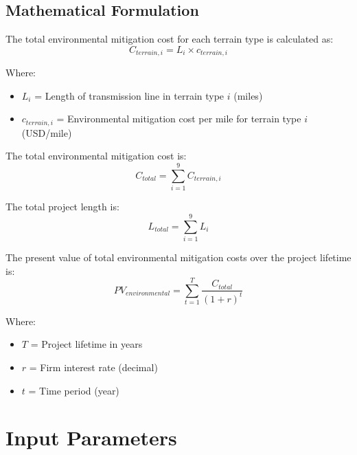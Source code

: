 \documentclass[12pt]{article}
\begin{document}
\subsection{Mathematical Formulation}

The total environmental mitigation cost for each terrain type is calculated as:
\begin{equation}
C_{terrain,i} = L_i \times c_{terrain,i}
\end{equation}

Where:
\begin{itemize}
    \item $L_i$ = Length of transmission line in terrain type $i$ (miles)
    \item $c_{terrain,i}$ = Environmental mitigation cost per mile for terrain type $i$ (USD/mile)
\end{itemize}

The total environmental mitigation cost is:
\begin{equation}
C_{total} = \sum_{i=1}^{9} C_{terrain,i}
\end{equation}

The total project length is:
\begin{equation}
L_{total} = \sum_{i=1}^{9} L_i
\end{equation}

The present value of total environmental mitigation costs over the project lifetime is:
\begin{equation}
PV_{environmental} = \sum_{t=1}^{T} \frac{C_{total}}{(1 + r)^t}
\end{equation}

Where:
\begin{itemize}
    \item $T$ = Project lifetime in years
    \item $r$ = Firm interest rate (decimal)
    \item $t$ = Time period (year)
\end{itemize}

\section{Input Parameters}
\end{document}
